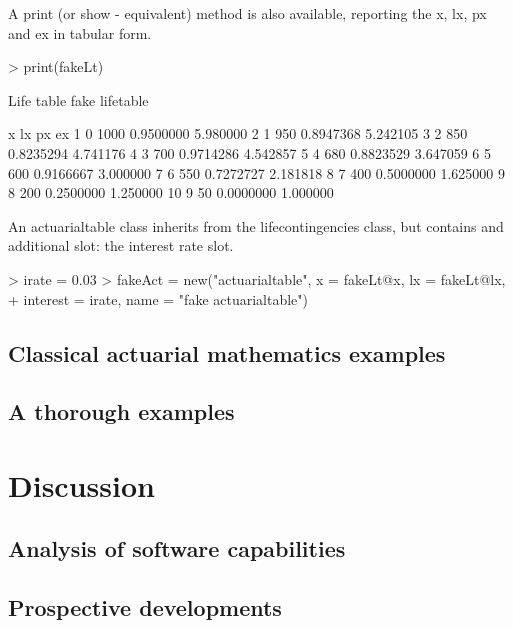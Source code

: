 \documentclass[a4paper]{article}
\begin{document}
A print (or show - equivalent) method is also available, reporting the x, lx, px and ex in tabular form.

\begin{Schunk}
\begin{Sinput}
> print(fakeLt)
\end{Sinput}
\begin{Soutput}
Life table fake lifetable 

   x   lx        px       ex
1  0 1000 0.9500000 5.980000
2  1  950 0.8947368 5.242105
3  2  850 0.8235294 4.741176
4  3  700 0.9714286 4.542857
5  4  680 0.8823529 3.647059
6  5  600 0.9166667 3.000000
7  6  550 0.7272727 2.181818
8  7  400 0.5000000 1.625000
9  8  200 0.2500000 1.250000
10 9   50 0.0000000 1.000000
\end{Soutput}
\end{Schunk}

An actuarialtable class inherits from the lifecontingencies class, but contains and additional slot: the interest rate
slot.\\

\begin{Schunk}
\begin{Sinput}
> irate = 0.03
> fakeAct = new("actuarialtable", x = fakeLt@x, lx = fakeLt@lx, 
+     interest = irate, name = "fake actuarialtable")
\end{Sinput}
\end{Schunk}

\subsection{Classical actuarial mathematics examples}

\subsection{A thorough examples}

\clearpage
\newpage

\section{Discussion} \label{sec:discussion}

\subsection{Analysis of software capabilities}
\subsection{Prospective developments}



\end{document}

